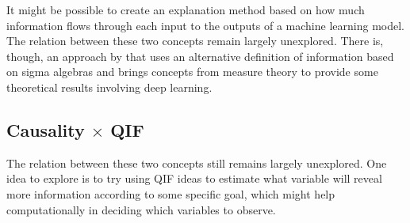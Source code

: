 It might be possible to create an explanation method based on how much information flows through each input to the outputs of a machine learning model. The relation between these two concepts remain largely unexplored. There is, though, an approach by \cite[Part~III]{calin2020deep} that uses an alternative definition of information based on sigma algebras and brings concepts from measure theory to provide some theoretical results involving deep learning.

\subsection{Causality $\times$ QIF}

The relation between these two concepts still remains largely unexplored. One idea to explore is to try using QIF ideas to estimate what variable will reveal more information according to some specific goal, which might help computationally in deciding which variables to observe.

